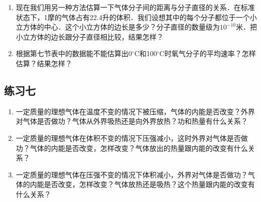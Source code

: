 \begin{enumerate}
	\item 现在我们用另一种方法估算一下气体分子间的距离与分子直径的关系．在标准状态下，1摩的气体占有22.4升的体积．我们设想其中的每个分子都位于一个小立方体的中心．这个小立方体的边长是多少？分子直径的数量级为$10^{-10}$米．把小立方体的边长跟分子直径相比较，结果怎样？

\begin{solution}
    
\end{solution}
\item 根据第七节表中的数据能不能估算出0$^\circ$C和100$^\circ$C时氧气分子的平均速率？怎样估算？结果怎样？

\begin{solution}
    
\end{solution}
\end{enumerate}



\subsection{练习七}
\begin{enumerate}
	\item 一定质量的理想气体在温度不变的情况下被压缩，气体的内能是否改变？外界对气体是否做功？气体从外界吸热还是向外界放热？功和热量有什么关系？

    \begin{solution}
        
    \end{solution}
\item 一定质量的理想气体在体积不变的情况下压强减小，这时外界对气体是否做功？气体的内能是否改变，怎样改变？气体放出的热量跟内能的改变有什么关系？

\begin{solution}
    
\end{solution}
\item 一定质量的理想气体在压强不变的情况下体积减小，外界对气体是否做功？气体的内能是否改变，怎样改变？气体放热还是吸热？这个热量跟内能的改变有什么关系？

\begin{solution}
    
\end{solution}
\end{enumerate}




